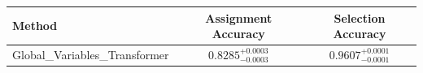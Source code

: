     \begin{tabular}{lcc}
        \toprule
        Method & Assignment Accuracy & Selection Accuracy \\
        \midrule
        Global_Variables_Transformer & $0.8285_{-0.0003}^{+0.0003}$ & $0.9607_{-0.0001}^{+0.0001}$ \\
        \bottomrule
    \end{tabular}